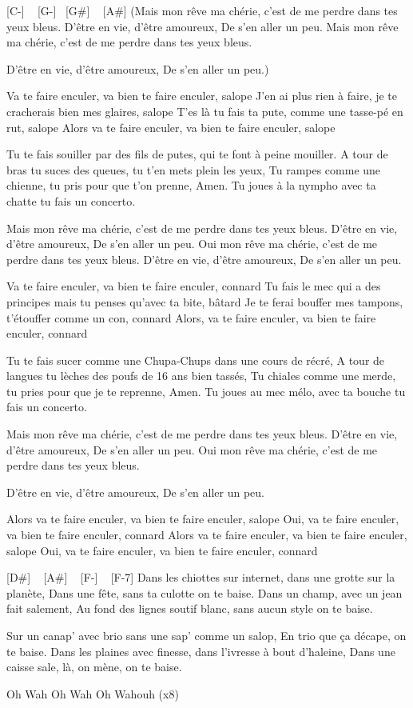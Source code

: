 [C-] ~ [G-] ~[G#] ~ [A#]
(Mais mon rêve ma chérie, c’est de me perdre dans tes yeux bleus.
D’être en vie, d’être amoureux,
De s’en aller un peu.
Mais mon rêve ma chérie, c’est de me perdre dans tes yeux bleus.

D’être en vie, d’être amoureux,
De s’en aller un peu.)

Va te faire enculer, va bien te faire enculer, salope
J’en ai plus rien à faire, je te cracherais bien mes glaires, salope
T’es là tu fais ta pute, comme une tasse-pé en rut, salope
Alors va te faire enculer, va bien te faire enculer, salope

Tu te fais souiller par des fils de putes, qui te font à peine mouiller.
A tour de bras tu suces des queues, tu t’en mets plein les yeux,
Tu rampes comme une chienne, tu pris pour que t’on prenne, Amen.
Tu joues à la nympho avec ta chatte tu fais un concerto.

Mais mon rêve ma chérie, c’est de me perdre dans tes yeux bleus.
D’être en vie, d’être amoureux,
De s’en aller un peu.
Oui mon rêve ma chérie, c’est de me perdre dans tes yeux bleus.
D’être en vie, d’être amoureux,
De s’en aller un peu.

Va te faire enculer, va bien te faire enculer, connard
Tu fais le mec qui a des principes mais tu penses qu’avec ta bite, bâtard
Je te ferai bouffer mes tampons, t’étouffer comme un con, connard
Alors, va te faire enculer, va bien te faire enculer, connard

Tu te fais sucer comme une Chupa-Chups dans une cours de récré,
A tour de langues tu lèches des poufs de 16 ans bien tassés,
Tu chiales comme une merde, tu pries pour que je te reprenne, Amen.
Tu joues au mec mélo, avec ta bouche tu fais un concerto.

Mais mon rêve ma chérie, c’est de me perdre dans tes yeux bleus.
D’être en vie, d’être amoureux,
De s’en aller un peu.
Oui mon rêve ma chérie, c’est de me perdre dans tes yeux bleus.

D’être en vie, d’être amoureux,
De s’en aller un peu.

Alors va te faire enculer, va bien te faire enculer, salope
Oui, va te faire enculer, va bien te faire enculer, connard
Alors va te faire enculer, va bien te faire enculer, salope
Oui, va te faire enculer, va bien te faire enculer, connard

[D#] ~ [A#] ~ [F-] ~ [F-7] 
Dans les chiottes sur internet, dans une grotte sur la planète,
Dans une fête, sans ta culotte on te baise.
Dans un champ, avec un jean fait salement,
Au fond des lignes soutif blanc, sans aucun style on te baise.

Sur un canap’ avec brio sans une sap’ comme un salop,
En trio que ça décape, on te baise.
Dans les plaines avec finesse, dans l’ivresse à bout d’haleine,
Dans une caisse sale, là, on mène, on te baise.

Oh Wah Oh Wah Oh Wahouh (x8)


